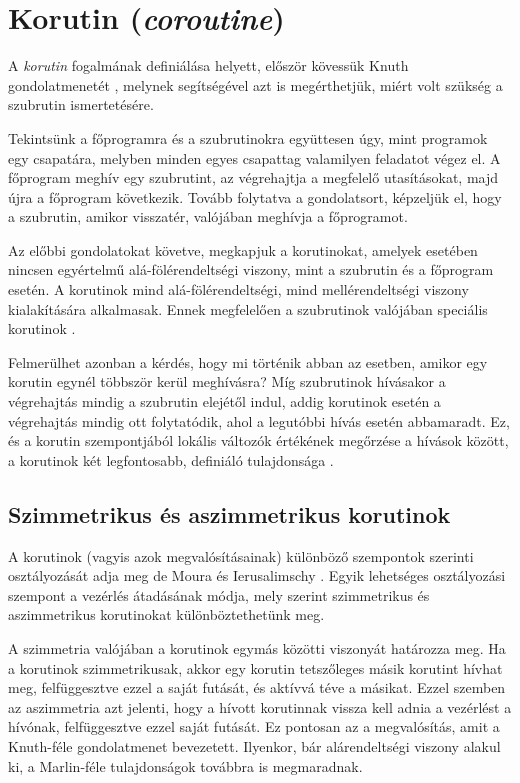 \section{Korutin (\textit{coroutine})}

A \textit{korutin} fogalmának definiálása helyett, először kövessük Knuth gondolatmenetét \cite{TAoCPVol1}, melynek segítségével azt is megérthetjük, miért volt szükség a szubrutin ismertetésére.

Tekintsünk a főprogramra és a szubrutinokra együttesen úgy, mint programok egy csapatára, melyben minden egyes csapattag valamilyen feladatot végez el. A főprogram meghív egy szubrutint, az végrehajtja a megfelelő utasításokat, majd újra a főprogram következik. Tovább folytatva a gondolatsort, képzeljük el, hogy a szubrutin, amikor visszatér, valójában meghívja a főprogramot. 

Az előbbi gondolatokat követve, megkapjuk a korutinokat, amelyek esetében nincsen egyértelmű alá-fölérendeltségi viszony, mint a szubrutin és a főprogram esetén. A ko\-rutinok mind alá-fölérendeltségi, mind mellérendeltségi viszony kialakítására alkalmasak. Ennek megfelelően a szubrutinok valójában speciális korutinok \cite{TAoCPVol1}.

Felmerülhet azonban a kérdés, hogy mi történik abban az esetben, amikor egy korutin egynél többször kerül meghívásra? Míg szubrutinok hívásakor a végrehajtás mindig a szubrutin elejétől indul, addig korutinok esetén a végrehajtás mindig ott folytatódik, ahol a legutóbbi hívás esetén abbamaradt. Ez, és a korutin szempontjából lokális változók értékének megőrzése a hívások között, a korutinok két legfontosabb, definiáló tulajdonsága \cite{Marlin1980}.

\subsection{Szimmetrikus és aszimmetrikus korutinok}

A korutinok (vagyis azok megvalósításainak) különböző szempontok szerinti osztályozását adja meg de Moura és Ierusalimschy \citeyear{RevisitingCoroutines}. Egyik lehetséges osztályozási szempont a vezérlés átadásának módja, mely szerint szimmetrikus és aszimmetrikus korutinokat különböztethetünk meg.

A szimmetria valójában a korutinok egymás közötti viszonyát határozza meg. Ha a korutinok szimmetrikusak, akkor egy korutin tetszőleges másik korutint hívhat meg, felfüggesztve ezzel a saját futását, és aktívvá téve a másikat. Ezzel szemben az aszimmetria azt jelenti, hogy a hívott korutinnak vissza kell adnia a vezérlést a hívónak, felfüggesztve ezzel saját futását. Ez pontosan az a megvalósítás, amit a Knuth-féle gondolatmenet bevezetett. Ilyenkor, bár alárendeltségi viszony alakul ki, a Marlin-féle tulajdonságok továbbra is megmaradnak.

